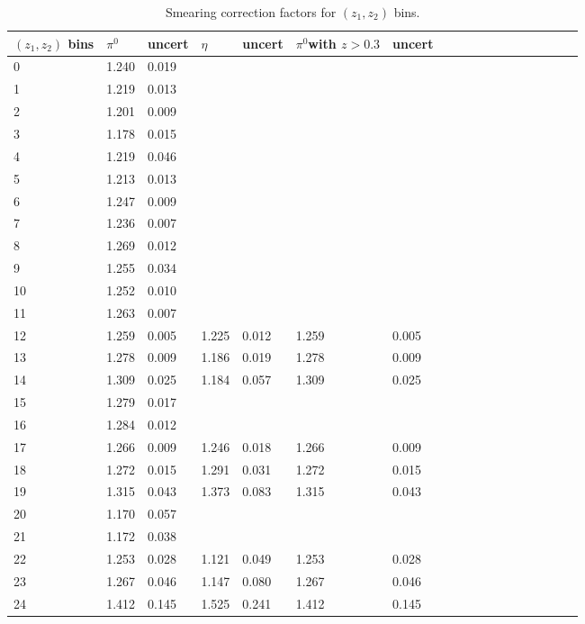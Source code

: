 \begin{table}[H]\footnotesize
\centering
\begin{tabular}{|l|l|l|l|l|l|l|l|l|l|l|l|l|l|l|l|l|l|}
\\ \hline
$(z_1,z_2)$ bins & $\pi^0$ &  uncert & $\eta$  &  uncert& $\pi^0$\scriptsize{with $z>0.3$} &uncert  \\ \hline
0	&	1.240	&	0.019	&		&		&		&		\\ \hline
1	&	1.219	&	0.013	&		&		&		&		\\ \hline
2	&	1.201	&	0.009	&		&		&		&		\\ \hline
3	&	1.178	&	0.015	&		&		&		&		\\ \hline
4	&	1.219	&	0.046	&		&		&		&		\\ \hline
5	&	1.213	&	0.013	&		&		&		&		\\ \hline
6	&	1.247	&	0.009	&		&		&		&		\\ \hline
7	&	1.236	&	0.007	&		&		&		&		\\ \hline
8	&	1.269	&	0.012	&		&		&		&		\\ \hline
9	&	1.255	&	0.034	&		&		&		&		\\ \hline
10	&	1.252	&	0.010	&		&		&		&		\\ \hline
11	&	1.263	&	0.007	&		&		&		&		\\ \hline
12	&	1.259	&	0.005	&	1.225	&	0.012	&	1.259	&	0.005	\\ \hline
13	&	1.278	&	0.009	&	1.186	&	0.019	&	1.278	&	0.009	\\ \hline
14	&	1.309	&	0.025	&	1.184	&	0.057	&	1.309	&	0.025	\\ \hline
15	&	1.279	&	0.017	&		&		&		&		\\ \hline
16	&	1.284	&	0.012	&		&		&		&		\\ \hline
17	&	1.266	&	0.009	&	1.246	&	0.018	&	1.266	&	0.009	\\ \hline
18	&	1.272	&	0.015	&	1.291	&	0.031	&	1.272	&	0.015	\\ \hline
19	&	1.315	&	0.043	&	1.373	&	0.083	&	1.315	&	0.043	\\ \hline
20	&	1.170	&	0.057	&		&		&		&		\\ \hline
21	&	1.172	&	0.038	&		&		&		&		\\ \hline
22	&	1.253	&	0.028	&	1.121	&	0.049	&	1.253	&	0.028	\\ \hline
23	&	1.267	&	0.046	&	1.147	&	0.080	&	1.267	&	0.046	\\ \hline
24	&	1.412	&	0.145	&	1.525	&	0.241	&	1.412	&	0.145	\\ \hline
\end{tabular}
\caption{Smearing correction factors for $(z_1,z_2)$ bins.}
\label{tab:comz_smearing_info}
\end{table}

